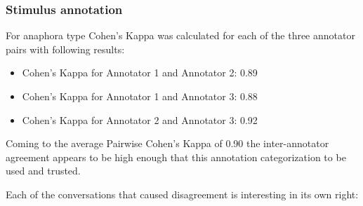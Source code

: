 \subsubsection{Stimulus annotation}

For anaphora type Cohen's Kappa was calculated for each of the three annotator pairs
with following results:

\begin{itemize}[label={}]
    \item Cohen's Kappa for Annotator 1 and Annotator 2: 0.89
    \item Cohen's Kappa for Annotator 1 and Annotator 3: 0.88
    \item Cohen's Kappa for Annotator 2 and Annotator 3: 0.92
\end{itemize}

Coming to the average Pairwise Cohen's Kappa of 0.90
the inter-annotator agreement appears to be high enough
that this annotation categorization to be used and trusted.

Each of the conversations that caused disagreement is interesting in its own right:


